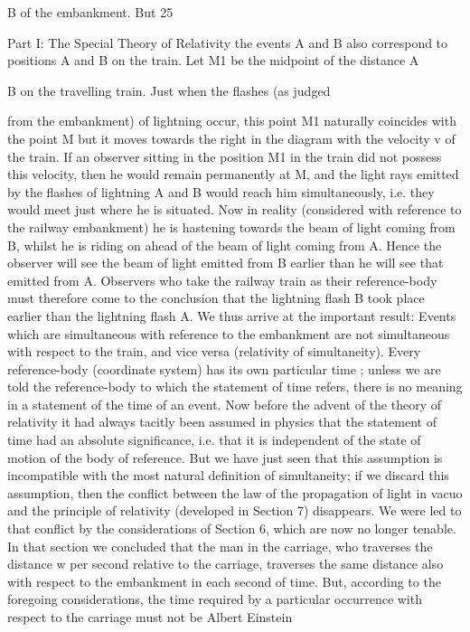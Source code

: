 \documentclass{article}
\begin{document}
B of the embankment. But
25

Part I: The Special Theory of Relativity
the events A and B also correspond to positions A and B on the train. Let M1 be the midpoint of the distance A

B on the travelling train. Just when the flashes (as judged

from the embankment) of lightning occur, this point M1 naturally coincides with the point
M but it moves towards the right in the diagram with the velocity v of the train. If an
observer sitting in the position M1 in the train did not possess this velocity, then he would
remain permanently at M, and the light rays emitted by the flashes of lightning A and B
would reach him simultaneously, i.e. they would meet just where he is situated. Now in
reality (considered with reference to the railway embankment) he is hastening towards the
beam of light coming from B, whilst he is riding on ahead of the beam of light coming from
A. Hence the observer will see the beam of light emitted from B earlier than he will see that
emitted from A. Observers who take the railway train as their reference-body must therefore
come to the conclusion that the lightning flash B took place earlier than the lightning flash
A. We thus arrive at the important result:
Events which are simultaneous with reference to the
embankment are not simultaneous with respect to the train, and
vice versa (relativity of simultaneity). Every reference-body (coordinate system) has its own particular time ; unless we are told
the reference-body to which the statement of time refers, there is
no meaning in a statement of the time of an event.
Now before the advent of the theory of relativity it had always tacitly been assumed in
physics that the statement of time had an absolute significance, i.e. that it is independent of
the state of motion of the body of reference. But we have just seen that this assumption is
incompatible with the most natural definition of simultaneity; if we discard this assumption,
then the conflict between the law of the propagation of light in vacuo and the principle of
relativity (developed in Section 7) disappears.
We were led to that conflict by the considerations of Section 6, which are now no longer
tenable. In that section we concluded that the man in the carriage, who traverses the
distance w per second relative to the carriage, traverses the same distance also with respect
to the embankment in each second of time. But, according to the foregoing considerations,
the time required by a particular occurrence with respect to the carriage must not be
Albert Einstein
\end{document}
